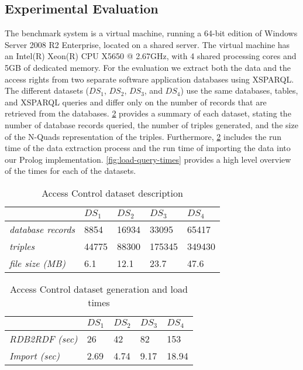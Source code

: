 \subsection{Experimental Evaluation}
\label{sec:evaluation}

The benchmark system is a virtual machine, running a 64-bit edition of Windows Server 2008 R2 Enterprise, located on a shared server. 
%
The virtual machine has an Intel(R) Xeon(R) CPU X5650 @ 2.67GHz, with 4 shared processing cores and 5GB of dedicated memory. 
%
For the evaluation we extract both the data and the access rights from two separate software application databases using
XSPARQL.
%
The different datasets ($DS_1$, $DS_2$, $DS_3$, and $DS_4$) use the same databases, tables, and XSPARQL queries and
differ only on the number of records that are retrieved from the databases.
%
\cref{fig:xsparql-evaluation} provides a summary of each dataset, stating the number of database records queried,
the number of triples generated, and the size of the N-Quads representation of the triples.
%
Furthermore, \cref{fig:xsparql-evaluation} includes the run time of the data extraction process and the run time of
importing the data into our Prolog implementation. \cref{fig:load-query-times} provides a high level overview of
the times for each of the datasets.
%

\begin{table} [t]
\centering
\caption{Access Control dataset description}
\label{tab:dataset-description}
\begin{tabular}{lllll}
\toprule
& $DS_1$  & $DS_2$  & $DS_3$  & $DS_4$  \\
\midrule
\emph{database records} & 8854 & 16934 & 33095  & 65417    \\
\emph{triples} & 44775  & 88300 & 175345 & 349430    \\
\emph{file size (MB)} & 6.1 & 12.1 & 23.7  & 47.6   \\
\bottomrule
\end{tabular}
\end{table}

\begin{table} [t]
\centering
\caption{Access Control dataset generation and load times}
\label{fig:xsparql-evaluation}
\begin{tabular}{lllll}
\toprule
& $DS_1$  & $DS_2$  & $DS_3$  & $DS_4$  \\
\midrule
\emph{RDB2RDF (sec)} & 26 & 42  & 82  &  153 \\
\emph{Import (sec)} & 2.69  & 4.74  &  9.17 & 18.94  \\
\bottomrule
\end{tabular}
\end{table}

